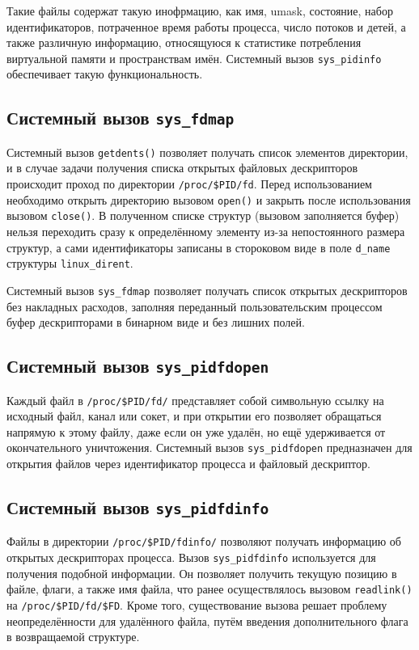 Такие файлы содержат такую инофрмацию, как имя, umask, состояние, набор
идентификаторов, потраченное время работы процесса, число потоков и детей, а
также различную информацию, относящуюся к статистике потребления виртуальной
памяти и пространствам имён. Системный вызов \texttt{sys\_pidinfo} обеспечивает
такую функциональность.

\subsection{Системный вызов \texttt{sys\_fdmap}}
\label{sub:sys:sys_fdmap}

Системный вызов \texttt{getdents()} позволяет получать список элементов
директории, и в случае задачи получения списка открытых файловых
дескрипторов происходит проход по директории \texttt{/proc/\$PID/fd}. Перед
использованием необходимо открыть директорию вызовом \texttt{open()} и закрыть
после использования вызовом \texttt{close()}. В полученном списке структур
(вызовом заполняется буфер) нельзя переходить сразу к определённому элементу
из-за непостоянного размера структур, а сами идентификаторы записаны в
стороковом виде в поле \texttt{d\_name} структуры \texttt{linux\_dirent}.

Системный вызов \texttt{sys\_fdmap} позволяет получать список открытых
дескрипторов без накладных расходов, заполняя переданный пользовательским
процессом буфер дескрипторами в бинарном виде и без лишних полей.

\subsection{Системный вызов \texttt{sys\_pidfdopen}}
\label{sub:sys:sys_pidfdopen}

Каждый файл в \texttt{/proc/\$PID/fd/} представляет собой символьную ссылку на
исходный файл, канал или сокет, и при открытии его позволяет обращаться напрямую
к этому файлу, даже если он уже удалён, но ещё удерживается от окончательного
уничтожения. Системный вызов \texttt{sys\_pidfdopen} предназначен для открытия
файлов через идентификатор процесса и файловый дескриптор. 

\subsection{Системный вызов \texttt{sys\_pidfdinfo}}
\label{sub:sys:sys_pidfdinfo}

Файлы в директории \texttt{/proc/\$PID/fdinfo/} позволяют получать информацию
об открытых дескрипторах процесса. Вызов
\texttt{sys\_pidfdinfo} используется для получения подобной информации. Он
позволяет получить текущую позицию в файле, флаги, а также имя файла, что ранее
осуществлялось вызовом \texttt{readlink()} на \texttt{/proc/\$PID/fd/\$FD}.
Кроме того, существование вызова решает проблему неопределённости для удалённого
файла, путём введения дополнительного флага в возвращаемой структуре.

